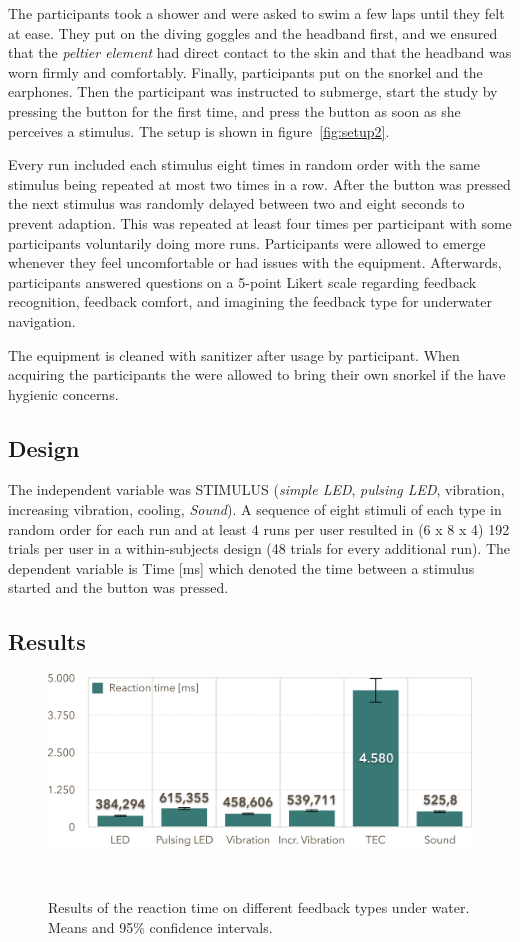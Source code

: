 The participants took a shower and were asked to swim a few laps until they felt at ease. 
They put on the diving goggles and the headband first, and we ensured that the \emph{peltier element} had direct contact to the skin and that the headband was worn firmly and comfortably. 
Finally, participants put on the snorkel and the earphones. 
Then the participant was instructed to submerge, start the study by pressing the button for the first time, and press the button as soon as she perceives a stimulus.
The setup is shown in figure~\ref{fig:setup2}. 

Every run included each stimulus eight times in random order with the same stimulus being repeated at most two times in a row. After the button was pressed the next stimulus was randomly delayed between two and eight seconds to prevent adaption. 
This was repeated at least four times per participant with some participants voluntarily doing more runs. 
Participants were allowed to emerge whenever they feel uncomfortable or had issues with the equipment. 
Afterwards, participants answered questions on a 5-point Likert scale regarding feedback recognition, feedback comfort, and imagining the feedback type for underwater navigation.

The equipment is cleaned with sanitizer after usage by participant. 
When acquiring the participants the were allowed to bring their own snorkel if the have hygienic concerns. 

\subsection{Design}
The independent variable was STIMULUS (\emph{simple LED}, \emph{pulsing LED}, vibration, increasing vibration, cooling, \emph{Sound}). 
A sequence of eight stimuli of each type in random order for each run and at least 4 runs per user resulted in (6 x 8 x 4) 192 trials per user in a within-subjects design (48 trials for every additional run). 
The dependent variable is Time [ms] which denoted the time between a stimulus started and the button was pressed.

\subsection{Results}
\begin{figure}
	\centering
	\includegraphics[width=\columnwidth]{images/ResultsOfReactionTimes}
	\caption{Results of the reaction time on different feedback types under water. Means and 95\% confidence intervals.}~\label{fig:reactiontimes}
	\vspace{-2em}
\end{figure}

